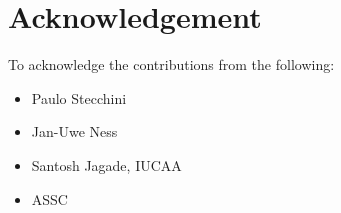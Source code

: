 \section*{Acknowledgement}
    To acknowledge the contributions from the following:
    \begin{itemize}
        \item Paulo Stecchini
        \item Jan-Uwe Ness
        \item Santosh Jagade, IUCAA
        \item ASSC
    \end{itemize}
